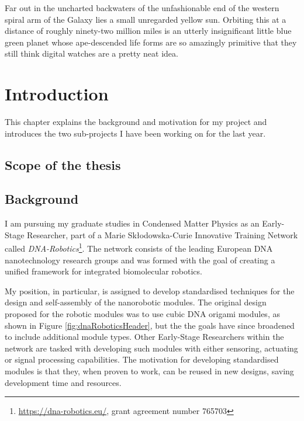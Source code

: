 \begin{savequote}[8cm]
Far out in the uncharted backwaters of the unfashionable end of the western spiral arm of the Galaxy lies a small unregarded yellow sun. Orbiting this at a distance of roughly ninety-two million miles is an utterly insignificant little blue green planet whose ape-descended life forms are so amazingly primitive that they still think digital watches are a pretty neat idea.
\end{savequote}

\chapter{Introduction}\label{ch:1-intro}

\minitoc

This chapter explains the background and motivation for my project and introduces the two sub-projects I have been working on for the last year.


\section{Scope of the thesis}

\section{Background}
I am pursuing my graduate studies in Condensed Matter Physics as an Early-Stage Researcher, part of a Marie Skłodowska-Curie Innovative Training Network called \emph{DNA-Robotics}\footnote{\url{https://dna-robotics.eu/}, grant agreement number 765703}. The network consists of the leading European DNA nanotechnology research groups and was formed with the goal of creating a unified framework for integrated biomolecular robotics\cite{dnaroboticsResearch}.

My position, in particular, is assigned to develop standardised techniques for the design and self-assembly of the nanorobotic modules\cite{dnaroboticsESR12}. The original design proposed for the robotic modules was to use cubic DNA origami modules, as shown in Figure \ref{fig:dnaRoboticsHeader}, but the the goals have since broadened to include additional module types. Other Early-Stage Researchers within the network are tasked with developing such modules with either sensoring, actuating or signal processing capabilities. The motivation for developing standardised modules is that they, when proven to work, can be reused in new designs, saving development time and resources.

